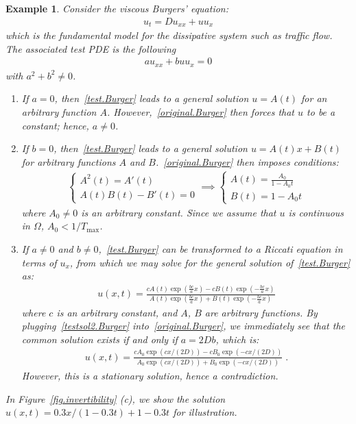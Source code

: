 \documentclass[a4paper,11pt]{article}
\newtheorem{example}{Example}[section]
\begin{document}
\begin{example}
Consider the viscous Burgers' equation:
\begin{align}
u_t=Du_{xx}+uu_x\label{original.Burger}	
\end{align}
which is the fundamental model for the dissipative system such as traffic flow. The associated test PDE is the following
\begin{align}
au_{xx}+buu_{x}=0\label{test.Burger}	
\end{align}
with $a^2+b^2\neq 0$.
\begin{enumerate}
\item If $a = 0$, then~\eqref{test.Burger} leads to a general solution $u=A(t)$ for an arbitrary function $A$. However,~\eqref{original.Burger} then forces that $u$ to be a constant; hence, $a\neq 0$.
\item If $b = 0$, then~\eqref{test.Burger} leads to a general solution $u=A(t)x+B(t)$ for  arbitrary functions $A$  and $B$.~\eqref{original.Burger} then imposes conditions:
\begin{align}
\begin{cases}
A^2(t)=A'(t)\\
A(t)B(t)-B'(t)=0
\end{cases}	\implies\begin{cases}
A(t)=\frac{A_0}{1-A_0t}\\
B(t)=1-A_0t
\end{cases}
\end{align}
where $A_0\neq 0$ is an arbitrary constant. Since we assume that $u$ is continuous in $\Omega$, $A_0<1/T_{\max}$.
\item If $a\neq 0$ and $b\neq 0$,~\eqref{test.Burger} can be transformed to a Riccati equation in terms of $u_x$, from which we may solve for the general solution of~\eqref{test.Burger} as:
\begin{align}
u(x,t)=	\frac{cA(t)\exp(\frac{bc}{a}x)-cB(t)\exp(-\frac{bc}{a}x)}{A(t)\exp(\frac{bc}{a}x)+B(t)\exp(-\frac{bc}{a}x)}\label{testsol2.Burger}
\end{align}
where $c$ is an arbitrary constant, and $A$, $B$ are arbitrary functions. By plugging~\eqref{testsol2.Burger} into~\eqref{original.Burger}, we immediately see that the common solution exists if and only if $a=2Db$, which is:
\begin{align}
u(x,t) = \frac{cA_0\exp(cx/(2D))-cB_0\exp(-cx/(2D))}{A_0\exp(cx/(2D))+B_0\exp(-cx/(2D))}\;.	
\end{align}
However, this is a stationary solution, hence a contradiction.
\end{enumerate}
In Figure~\ref{fig.invertibility} (c), we show the solution $u(x,t)=0.3x/(1-0.3t)+1-0.3t$ for illustration.
\end{example}
\end{document}
